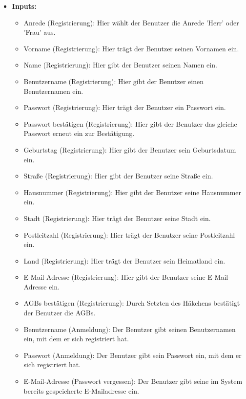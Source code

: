 \begin{itemize}
			\item \textbf{Inputs:}
			\begin{itemize}
				\item Anrede (Registrierung): Hier wählt der Benutzer die Anrede 'Herr' oder 'Frau' aus.
				\item Vorname (Registrierung): Hier trägt der Benutzer seinen Vornamen ein.
				\item Name (Registrierung): Hier gibt der Benutzer seinen Namen ein.
				\item Benutzername (Registrierung): Hier gibt der Benutzer einen Benutzernamen ein.
				\item Passwort (Registrierung): Hier trägt der Benutzer ein Passwort ein.
				\item Passwort bestätigen (Registrierung): Hier gibt der Benutzer das gleiche Passwort erneut ein zur Bestätigung.
				\item Geburtstag (Registrierung): Hier gibt der Benutzer sein Geburtsdatum ein.
				\item Straße (Registrierung): Hier gibt der Benutzer seine Straße ein.
				\item Hausnummer (Registrierung): Hier gibt der Benutzer seine Hausnummer ein.
				\item Stadt (Registrierung): Hier trägt der Benutzer seine Stadt ein.
				\item Postleitzahl (Registrierung): Hier trägt der Benutzer seine Postleitzahl ein.
				\item Land (Registrierung): Hier trägt der Benutzer sein Heimatland ein.
				\item E-Mail-Adresse (Registrierung): Hier gibt der Benutzer seine E-Mail-Adresse ein.
				\item AGBs bestätigen (Registrierung): Durch Setzten des Häkchens bestätigt der Benutzer die AGBs. 
				\item Benutzername (Anmeldung): Der Benutzer gibt seinen Benutzernamen ein, mit dem er sich registriert hat.
				\item Passwort (Anmeldung): Der Benutzer gibt sein Passwort ein, mit dem er sich registriert hat.
				\item E-Mail-Adresse (Passwort vergessen): Der Benutzer gibt seine im System bereits gespeicherte E-Mailadresse ein.
				
				\begin{center}
					\begin{longtable}{|p{3cm} |p{5cm} | p{4cm}|p{3cm}|}
						

\end{longtable}
\end{center}
\end{itemize}
\end{itemize}
